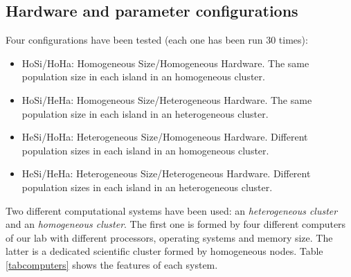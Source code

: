 \documentclass[final,1p,times]{elsarticle}
\begin{document}
\subsection{Hardware and parameter configurations}

Four configurations have been tested (each one has been run 30 times):

\begin{itemize}
\item HoSi/HoHa: Homogeneous Size/Homogeneous Hardware. The same population size in each island in an homogeneous cluster.
\item HoSi/HeHa: Homogeneous Size/Heterogeneous Hardware. The same population size in each island in an heterogeneous cluster.
\item HeSi/HoHa: Heterogeneous Size/Homogeneous Hardware. Different population sizes in each island in an homogeneous cluster.
\item HeSi/HeHa: Heterogeneous Size/Heterogeneous Hardware. Different population sizes in each island in an heterogeneous cluster.
\end{itemize}

Two different computational systems have been used: an {\em heterogeneous cluster} and an {\em homogeneous cluster}. The first one is formed by four different computers of our lab with different processors, operating systems and memory size. The latter is a dedicated scientific cluster formed by homogeneous nodes. Table \ref{tabcomputers} shows the features of each system.

\begin{table*}
\end{table*}
\end{document}
